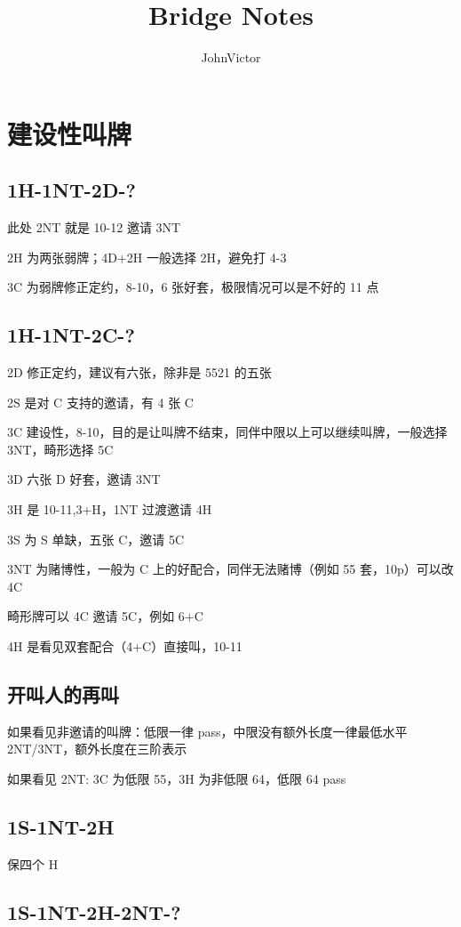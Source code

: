\documentclass[UTF8]{article}
\title{Bridge Notes}
\author{JohnVictor}
\date{}
\begin{document}
\maketitle
\section{建设性叫牌}
\subsection*{1H-1NT-2D-?}

此处 2NT 就是 10-12 邀请 3NT

2H 为两张弱牌；4D+2H 一般选择 2H，避免打 4-3

3C 为弱牌修正定约，8-10，6 张好套，极限情况可以是不好的 11 点

\subsection*{1H-1NT-2C-?}

2D 修正定约，建议有六张，除非是 5521 的五张

2S 是对 C 支持的邀请，有 4 张 C

3C 建设性，8-10，目的是让叫牌不结束，同伴中限以上可以继续叫牌，一般选择 3NT，畸形选择 5C

3D 六张 D 好套，邀请 3NT

3H 是 10-11,3+H，1NT 过渡邀请 4H

3S 为 S 单缺，五张 C，邀请 5C

3NT 为赌博性，一般为 C 上的好配合，同伴无法赌博（例如 55 套，10p）可以改 4C

畸形牌可以 4C 邀请 5C，例如 6+C

4H 是看见双套配合（4+C）直接叫，10-11

\subsection*{开叫人的再叫}

如果看见非邀请的叫牌：低限一律 pass，中限没有额外长度一律最低水平 2NT/3NT，额外长度在三阶表示

如果看见 2NT: 3C 为低限 55，3H 为非低限 64，低限 64 pass

\subsection*{1S-1NT-2H}

保四个 H

\subsection*{1S-1NT-2H-2NT-?}
\end{document}

